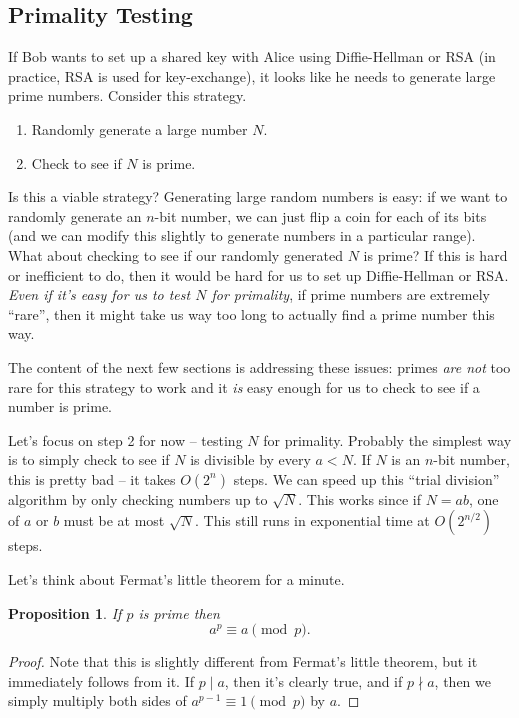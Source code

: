 \documentclass[12pt]{article}
\theoremstyle{plain}
\newtheorem{proposition}[theorem]{Proposition}
\theoremstyle{definition}
\theoremstyle{remark}
\begin{document}
\subsection{Primality Testing}
If Bob wants to set up a shared key with Alice using Diffie-Hellman or RSA (in practice, RSA is used for key-exchange), it looks like he needs to generate large prime numbers.
Consider this strategy.
\begin{enumerate}
    \item Randomly generate a large number $N$.
    \item Check to see if $N$ is prime.
\end{enumerate}
Is this a viable strategy?
Generating large random numbers is easy: if we want to randomly generate an $n$-bit number, we can just flip a coin for each of its bits (and we can modify this slightly to generate numbers in a particular range).
What about checking to see if our randomly generated $N$ is prime?
If this is hard or inefficient to do, then it would be hard for us to set up Diffie-Hellman or RSA.
\emph{Even if it's easy for us to test $N$ for primality}, if prime numbers are extremely ``rare'', then it might take us way too long to actually find a prime number this way.

The content of the next few sections is addressing these issues: primes \emph{are not} too rare for this strategy to work and it \emph{is} easy enough for us to check to see if a number is prime.


Let's focus on step 2 for now -- testing $N$ for primality.
Probably the simplest way is to simply check to see if $N$ is divisible by every $a<N$.
If $N$ is an $n$-bit number, this is pretty bad -- it takes $O(2^n)$ steps.
We can speed up this ``trial division'' algorithm by only checking numbers up to $\sqrt{N}$.
This works since if $N = ab$, one of $a$ or $b$ must be at most $\sqrt{N}$.
This still runs in exponential time at $O(2^{n/2})$ steps.

Let's think about Fermat's little theorem for a minute.
\begin{proposition}
    If $p$ is prime then
    \[
        a^p\equiv a\pmod p.
    \]
\end{proposition}
\begin{proof}
    Note that this is slightly different from Fermat's little theorem, but it immediately follows from it.
    If $p\mid a$, then it's clearly true, and if $p\nmid a$, then we simply multiply both sides of $a^{p-1}\equiv 1\pmod p$ by $a$.
\end{proof}
\end{document}
